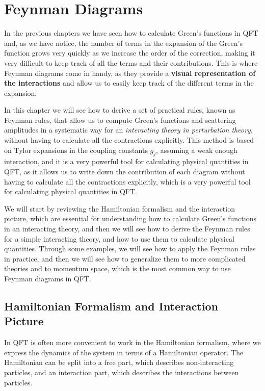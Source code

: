 \chapter{Feynman Diagrams}

In the previous chapters we have seen how to calculate Green's functions in QFT and, as we have notice, the number of terms in the expansion of the Green's function grows very quickly as we increase the order of the correction, making it very difficult to keep track of all the terms and their contributions. This is where Feynman diagrams come in handy, as they provide a \textbf{visual representation of the interactions} and allow us to easily keep track of the different terms in the expansion.

In this chapter we will see how to derive a set of practical rules, known as Feynman rules, that allow us to compute Green's functions and scattering amplitudes in a systematic way for an \textit{interacting theory in perturbation theory}, without having to calculate all the contractions explicitly. This method is based on Tylor expansions in the coupling constants \(g_j\), assuming a weak enough interaction, and it is a very powerful tool for calculating physical quantities in QFT, as it allows us to write down the contribution of each diagram without having to calculate all the contractions explicitly, which is a very powerful tool for calculating physical quantities in QFT.

We will start by reviewing the Hamiltonian formalism and the interaction picture, which are essential for understanding how to calculate Green's functions in an interacting theory, and then we will see how to derive the Feynman rules for a simple interacting theory, and how to use them to calculate physical quantities. Through some examples, we will see how to apply the Feynman rules in practice, and then we will see how to generalize them to more complicated theories and to momentum space, which is the most common way to use Feynman diagrams in QFT.

\section{Hamiltonian Formalism and Interaction Picture}

In QFT is often more convenient to work in the Hamiltonian formalism, where we express the dynamics of the system in terms of a Hamiltonian operator. The Hamiltonian can be split into a free part, which describes non-interacting particles, and an interaction part, which describes the interactions between particles.

